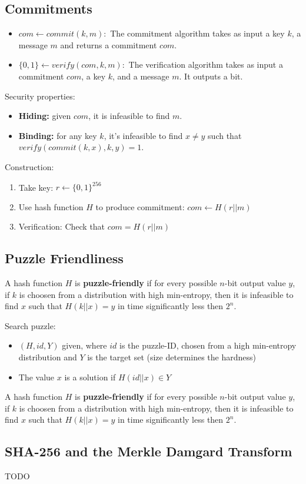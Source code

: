 \documentclass{scrartcl}
\begin{document}
\subsection{Commitments}
\begin{itemize}
    \item
        \(com \leftarrow commit(k, m):\) The commitment algorithm takes as input a key \(k\), a message \(m\) and returns a commitment \(com\).
    \item
        \(\{0,1\} \leftarrow verify(com, k, m):\) The verification algorithm takes as input a commitment \(com\), a key \(k\), and a message \(m\). It outputs a bit.
\end{itemize}
Security properties:
\begin{itemize}
    \item
        \textbf{Hiding:} given \(com\), it is infeasible to find \(m\).
    \item
        \textbf{Binding:} for any key \(k\), it's infeasible to find \(x\neq y\) such that \(verify(commit(k,x), k, y)=1\).
\end{itemize}
Construction:
\begin{enumerate}
    \item
        Take key: \(r \leftarrow \{0,1\}^{256}\)
    \item
        Use hash function \(H\) to produce commitment: \(com \leftarrow H(r||m)\)
    \item
        Verification: Check that \(com = H(r||m)\)
\end{enumerate}

\subsection{Puzzle Friendliness}
A hash function \(H\) is \textbf{puzzle-friendly} if for every possible \(n\)-bit output value \(y\), if \(k\) is choosen from a distribution with high min-entropy, then it is infeasible to find \(x\) such that \(H(k||x) =y\) in time significantly less then \(2^n\).

Search puzzle:
\begin{itemize}
    \item
        \((H, id, Y)\) given, where \(id\) is the puzzle-ID, chosen from a high min-entropy distribution and \(Y\) is the target set (size determines the hardness)
    \item
        The value \(x\) is a solution if \(H(id||x) \in Y\)
\end{itemize}

A hash function \(H\) is \textbf{puzzle-friendly} if for every possible \(n\)-bit output value \(y\), if \(k\) is choosen from a distribution with high min-entropy, then it is infeasible to find \(x\) such that \(H(k||x) =y\) in time significantly less then \(2^n\).

\subsection{SHA-256 and the Merkle Damgard Transform}
TODO
\end{document}
